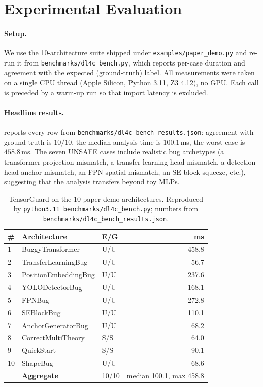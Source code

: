 \documentclass{article}
\theoremstyle{plain}
\theoremstyle{definition}
\newcommand{\code}[1]{\texttt{\small #1}}
\begin{document}
\section{Experimental Evaluation}\label{sec:experiments}

\paragraph{Setup.}  We use the 10-architecture suite shipped under
\code{examples/paper\_demo.py} and re-run it from
\code{benchmarks/dl4c\_bench.py}, which reports per-case duration and
agreement with the expected (ground-truth) label.  All measurements
were taken on a single CPU thread (Apple Silicon, Python 3.11,
Z3 4.12), no GPU.  Each call is preceded by a warm-up run so that
import latency is excluded.

\paragraph{Headline results.}
 reports every row from
\code{benchmarks/dl4c\_bench\_results.json}: agreement with ground
truth is $10/10$, the median analysis time is $100.1$\,ms, the
worst case is $458.8$\,ms.  The seven UNSAFE cases include
realistic bug archetypes (a transformer projection mismatch, a
transfer-learning head mismatch, a detection-head anchor mismatch,
an FPN spatial mismatch, an SE block squeeze, etc.), suggesting
that the analysis transfers beyond toy MLPs.

\begin{table}[t]
\centering\small
\caption{TensorGuard on the 10 paper-demo architectures.
Reproduced by \code{python3.11 benchmarks/dl4c\_bench.py}; numbers
from \code{benchmarks/dl4c\_bench\_results.json}.}
\label{tab:tg-bench}
\begin{tabular}{lll@{\,}r}
\toprule
\# & Architecture            & E/G  & ms \\
\midrule
1  & BuggyTransformer        & U/U  & 458.8 \\
2  & TransferLearningBug     & U/U  &  56.7 \\
3  & PositionEmbeddingBug    & U/U  & 237.6 \\
4  & YOLODetectorBug         & U/U  & 168.1 \\
5  & FPNBug                  & U/U  & 272.8 \\
6  & SEBlockBug              & U/U  & 110.1 \\
7  & AnchorGeneratorBug      & U/U  &  68.2 \\
8  & CorrectMultiTheory      & S/S  &  64.0 \\
9  & QuickStart              & S/S  &  90.1 \\
10 & ShapeBug                & U/U  &  68.6 \\
\midrule
   & \textbf{Aggregate}      & 10/10 & median 100.1, max 458.8 \\
\bottomrule
\end{tabular}
\end{table}
\end{document}
